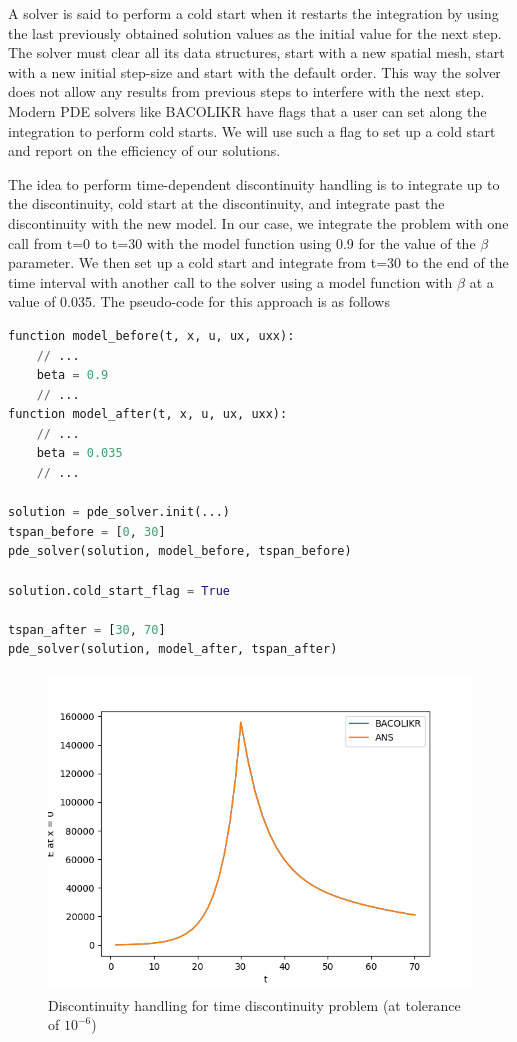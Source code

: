 \documentclass{article}
\begin{document}
A solver is said to perform a cold start when it restarts the integration by using the last previously obtained solution values as the initial value for the next step. The solver must clear all its data structures, start with a new spatial mesh, start with a new initial step-size and start with the default order. This way the solver does not allow any results from previous steps to interfere with the next step. Modern PDE solvers like BACOLIKR have flags that a user can set along the integration to perform cold starts. We will use such a flag to set up a cold start and report on the efficiency of our solutions.

The idea to perform time-dependent discontinuity handling is to integrate up to the discontinuity, cold start at the discontinuity, and integrate past the discontinuity with the new model. In our case, we integrate the problem with one call from t=0 to t=30 with the model function using 0.9 for the value of the $\beta$ parameter. We then set up a cold start and integrate from t=30 to the end of the time interval with another call to the solver using a model function with $\beta$ at a value of 0.035. The pseudo-code for this approach is as follows

\begin{minipage}{\linewidth}
\begin{lstlisting}[language=Python]
function model_before(t, x, u, ux, uxx):
	// ...
	beta = 0.9
	// ...
function model_after(t, x, u, ux, uxx):
	// ...
	beta = 0.035
	// ...

solution = pde_solver.init(...)
tspan_before = [0, 30]
pde_solver(solution, model_before, tspan_before)

solution.cold_start_flag = True

tspan_after = [30, 70]
pde_solver(solution, model_after, tspan_after)

\end{lstlisting}
\end{minipage}

\begin{figure}[H]
\centering
\includegraphics[width=0.7\linewidth]{./figures/pde_time_disc_disc_hand}
\caption{Discontinuity handling for time discontinuity problem (at tolerance of $10^{-6}$)}
\label{fig:pde_time_disc_disc_hand}
\end{figure}
\end{document}
